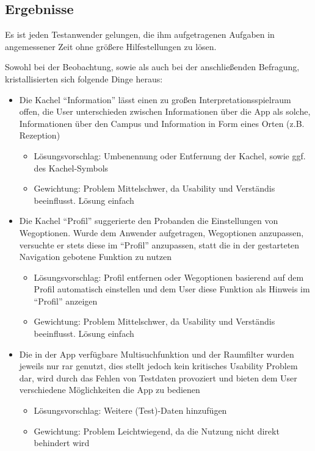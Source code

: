 \subsection*{Ergebnisse}

Es ist jeden Testanwender gelungen, die ihm aufgetragenen Aufgaben in
angemessener Zeit ohne größere Hilfestellungen zu lösen.

Sowohl bei der Beobachtung, sowie als auch bei der anschließenden Befragung,
kristallisierten sich folgende Dinge heraus:
\begin{itemize}
\item Die Kachel “Information” lässt einen zu großen Interpretationsspielraum
  offen, die User unterschieden zwischen Informationen über die App als solche,
  Informationen über den Campus und Information in Form eines Orten (z.B.
  Rezeption)
  \begin{itemize}
  \item Lösungsvorschlag: Umbenennung oder Entfernung der Kachel, sowie ggf.
    des Kachel-Symbols
  \item Gewichtung: Problem Mittelschwer, da Usability und Verständis
    beeinflusst. Lösung einfach
  \end{itemize}
\item Die Kachel “Profil” suggerierte den Probanden die Einstellungen von
  Wegoptionen. Wurde dem Anwender aufgetragen, Wegoptionen anzupassen, versuchte
  er stets diese im “Profil” anzupassen, statt die in der gestarteten Navigation
  gebotene Funktion zu nutzen
  \begin{itemize}
  \item Lösungsvorschlag: Profil entfernen oder Wegoptionen basierend auf dem
    Profil automatisch einstellen und dem User diese Funktion als Hinweis im
    “Profil” anzeigen
  \item Gewichtung: Problem Mittelschwer, da Usability und Verständis
    beeinflusst. Lösung einfach
  \end{itemize}
\item Die in der App verfügbare Multisuchfunktion und der Raumfilter wurden
  jeweils nur rar genutzt, dies stellt jedoch kein kritisches Usability Problem
  dar, wird durch das Fehlen von Testdaten provoziert und bieten dem User
  verschiedene Möglichkeiten die App zu bedienen
  \begin{itemize}
  \item Lösungsvorschlag: Weitere (Test)-Daten hinzufügen
  \item Gewichtung: Problem Leichtwiegend, da die Nutzung nicht direkt behindert
    wird
  \end{itemize}
\end{itemize}

